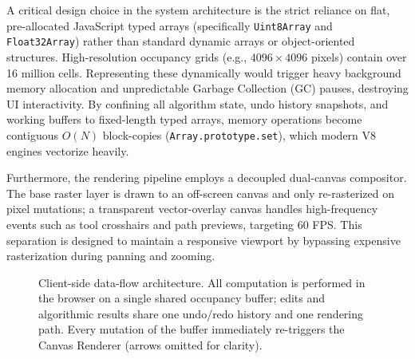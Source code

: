 \documentclass{IEEE_lsens}
\begin{document}
A critical design choice in the system architecture is the strict reliance on flat, pre-allocated JavaScript typed arrays (specifically \texttt{Uint8Array} and \texttt{Float32Array}) rather than standard dynamic arrays or object-oriented structures. High-resolution occupancy grids (e.g., $4096 \times 4096$ pixels) contain over 16 million cells. Representing these dynamically would trigger heavy background memory allocation and unpredictable Garbage Collection (GC) pauses, destroying UI interactivity. By confining all algorithm state, undo history snapshots, and working buffers to fixed-length typed arrays, memory operations become contiguous $O(N)$ block-copies (\texttt{Array.prototype.set}), which modern V8 engines vectorize heavily. 

Furthermore, the rendering pipeline employs a decoupled dual-canvas compositor. The base raster layer is drawn to an off-screen canvas and only re-rasterized on pixel mutations; a transparent vector-overlay canvas handles high-frequency events such as tool crosshairs and path previews, targeting 60 FPS. This separation is designed to maintain a responsive viewport by bypassing expensive rasterization during panning and zooming.

\begin{figure}[t]
\centering
{}
\caption{Client-side data-flow architecture. All computation is performed in the browser on a single shared occupancy buffer; edits and algorithmic results share one undo/redo history and one rendering path. Every mutation of the buffer immediately re-triggers the Canvas Renderer (arrows omitted for clarity).}
\label{fig:architecture}
\vspace{-3mm}
\end{figure}
\end{document}
